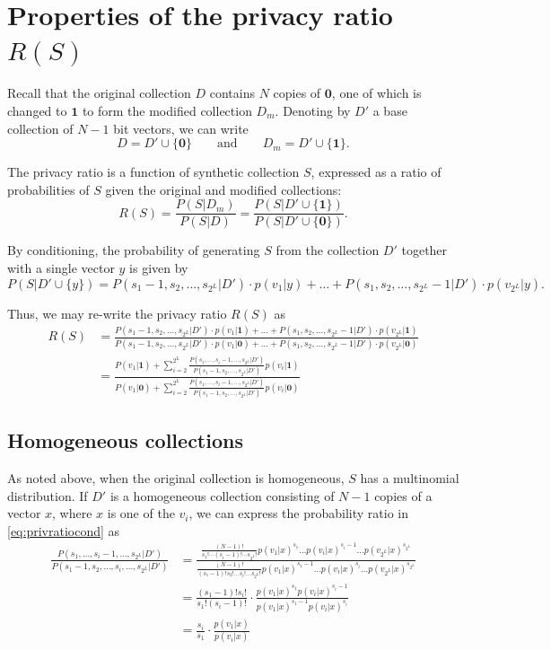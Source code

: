 \documentclass[11pt]{article}
\newcommand{\zv}{\textbf{0}}
\newcommand{\uv}{\textbf{1}}
\begin{document}
\section{Properties of the privacy ratio $R(S)$}

Recall that the original collection $D$ contains $N$ copies of $\zv$, one of which is changed to $\uv$ to form the modified collection $D_m$.
Denoting by $D'$ a base collection of $N-1$ bit vectors, we can write
\[ D = D' \cup \{\zv\} \qquad \text{and} \qquad D_m = D' \cup \{\uv\}. \]

The privacy ratio is a function of synthetic collection $S$, expressed as a ratio of probabilities of $S$ given the original and modified collections:
\begin{equation}
R(S) = \frac{P(S|D_m)}{P(S|D)} =  \frac{P(S|D' \cup \{\uv\})}{P(S|D' \cup \{\zv\})}.
\end{equation}

By conditioning, the probability of generating $S$ from the collection $D'$ together with a single vector $y$ is given by
\[
P(S|D'\cup\{y\}) = P(s_1-1,s_2,\dots,s_{2^L}|D')\cdot p(v_1|y) + \dots + P(s_1,s_2,\dots,s_{2^L} - 1 |D')\cdot p(v_{2^L}|y).
\]

Thus, we may re-write the privacy ratio $R(S)$ as
\begin{align}
R(S) &= \frac{P(s_1-1,s_2,\dots,s_{2^L}|D')\cdot p(v_1|\uv) + \dots + P(s_1,s_2,\dots,s_{2^L} - 1|D')\cdot p(v_{2^L}|\uv)}{P(s_1-1,s_2,\dots,s_{2^L}|D')\cdot p(v_1|\zv) + \dots + P(s_1,s_2,\dots,s_{2^L} - 1|D')\cdot p(v_{2^L}|\zv) }
\nonumber \\
 &= \frac {P(v_1|\uv)  + \sum_{i=2}^{2^L} \frac{P(s_1,\dots,s_i-1,\dots,s_{2^L}|D')}{P(s_1-1,s_2,\dots,s_{2^L}|D')} p(v_i|\uv)}
           { P(v_1|\zv)  + \sum_{i=2}^{2^L} \frac{P(s_1,\dots,s_i-1,\dots,s_{2^L}|D')}{P(s_1-1,s_2,\dots,s_{2^L}|D')} p(v_i|\zv)}
\label{eq:privratiocond}
\end{align}

\subsection{Homogeneous collections}

As noted above, when the original collection is homogeneous, $S$ has a multinomial distribution.
If $D'$ is a homogeneous collection consisting of $N-1$ copies of a vector $x$, where $x$ is one of the $v_i$, we can express the probability ratio in \eqref{eq:privratiocond} as
\begin{align}
\frac{P(s_1,\dots,s_i-1,\dots,s_{2^L}|D')}{P(s_1-1,s_2,\dots,s_i,\dots,s_{2^L}|D')}
&= \frac{ \frac{(N-1)!}{s_1! \cdots (s_i-1)!\cdots s_{2^L}!} p(v_1|x)^{s_1} \dots p(v_i|x)^{s_i-1} \dots p(v_{2^L}|x)^{s_{2^L}} }
{ \frac{(N-1)!}{(s_1-1)!s_2! \dots s_i!\dots s_{2^L}!} p(v_1|x)^{s_1-1} \dots p(v_i|x)^{s_i} \dots p(v_{2^L}|x)^{s_{2^L}}}
\nonumber \\
&= \frac{(s_1-1)!s_i!}{s_1!(s_i-1)!} \cdot \frac{p(v_1|x)^{s_1} p(v_i|x)^{s_i-1} }{  p(v_1|x)^{s_1-1} p(v_i|x)^{s_i} } 
\nonumber \\
&= \frac{s_i}{s_1} \cdot \frac{p(v_1|x)}{p(v_i|x)}
 \end{align}
\end{document}
